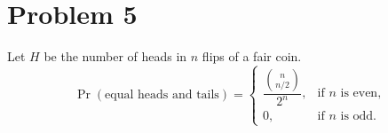 \section*{Problem 5}

Let $H$ be the number of heads in $n$ flips of a fair coin.
\[
\Pr(\text{equal heads and tails})=
\begin{cases}
\dfrac{\binom{n}{n/2}}{2^n}, & \text{if $n$ is even},\\[6pt]
0, & \text{if $n$ is odd}.
\end{cases}
\]
